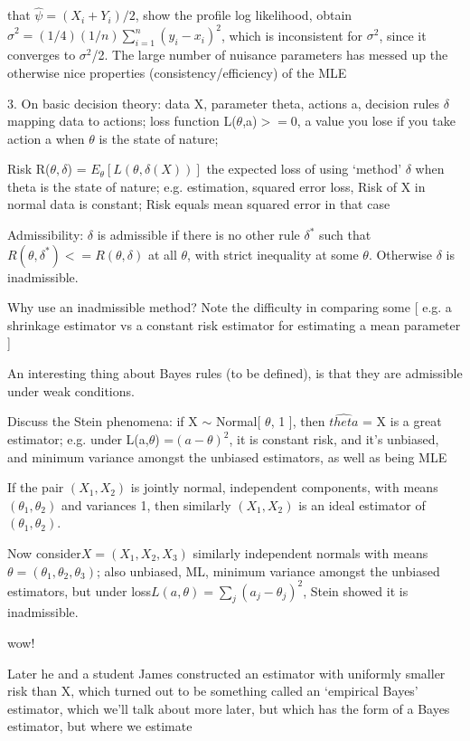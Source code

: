 \documentclass[11pt,a4paper]{article}
\begin{document}
	that $\hat{\psi} = (X_i+Y_i)/2$, show the profile log likelihood, obtain $\hat{\sigma}^2 = (1/4) (1/n) \sum_{i=1}^n (y_i-x_i)^2$, which is inconsistent for $\sigma^2$, since it converges to $\sigma^2$/2.   The large number of nuisance parameters has messed up the otherwise nice properties (consistency/efficiency) of the MLE
	
	3. On basic decision theory:   data X, parameter theta, actions a, decision rules $\delta$ mapping data to actions; loss function L($\theta$,a)$ >= $0, a value you lose if you take action a when $\theta$ is the state of nature; 
	
	Risk R($\theta, \delta$) = $E_\theta [   L(\theta, \delta(X) ) ]$    the expected loss of using `method' $\delta$ when theta is the state of nature; e.g. estimation, squared error loss, Risk of X in normal data is constant; Risk equals mean squared error in that case
	
	Admissibility:  $\delta$ is admissible if there is no other rule $\delta^*$ such that $R( \theta, \delta^* ) <= R(\theta, \delta)$ at all $\theta$, with strict inequality at some $\theta$.  Otherwise $\delta$ is inadmissible.   
	
	Why use an inadmissible method?   Note the difficulty in comparing some  [ e.g. a shrinkage estimator vs a constant risk estimator for estimating a mean parameter ]
	
	An interesting thing about Bayes rules (to be defined), is that they are admissible under weak conditions.
	
	Discuss the Stein phenomena:   if X $\sim$ Normal[ $\theta$, 1 ], then $\hat{theta}$ = X is a great estimator; e.g. under L(a,$\theta$) =$ (a-\theta)^2$, it is constant risk, and it's unbiased, and minimum variance amongst the unbiased estimators, as well as being MLE
	
	If the pair $(X_1,X_2)$ is jointly normal, independent components, with means $(\theta_1, \theta_2)$ and variances 1, then similarly $(X_1,X_2)$ is an ideal estimator of $(\theta_1, \theta_2)$.
	
	Now consider$ X=(X_1,X_2,X_3)$ similarly independent normals with means $\theta=(\theta_1, \theta_2,\theta_3)$; also unbiased, ML, minimum variance amongst the unbiased estimators, but under loss$ L(a,\theta) = \sum_j (a_j - \theta_j)^2$, Stein showed it is inadmissible.
	
	wow!
	
	Later he and a student James constructed an estimator with uniformly smaller risk than X, which turned out to be something called an `empirical Bayes' estimator, which we'll talk about more later, but which has the form of a Bayes estimator, but where we estimate 
	
\end{document}
